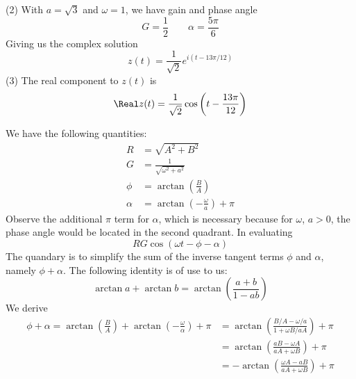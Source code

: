 \documentclass[a4paper]{article}
\begin{document}
(2) With \(a = \sqrt{3}\) and \(\omega = 1\), we have gain and phase angle
\[
	G = \frac{1}{2} \qquad \alpha = \frac{5 \pi }{6}
\]
Giving us the complex solution
\[
	z \!\left( t \right) = \frac{1}{\sqrt{2}}e^{i \!\left( t - 13 \pi /12 \right) }
\]
(3) The real component to \(z \!\left( t \right) \) is
\[
	\Real z \!\left( t \right) = \frac{1}{\sqrt{2}} \cos\left( t - \frac{13 \pi }{12} \right)
\]


We have the following quantities:
\begin{align*}
	R & = \sqrt{A^{2} + B^{2}} \\
	G & = \frac{1}{\sqrt{\omega^{2} + a^{2}}} \\ 
	\phi & = \arctan \!\left( \frac{B}{A} \right) \\
	\alpha & = \arctan \!\left( -\frac{\omega }{a} \right) + \pi 
\end{align*}
Observe the additional \(\pi \) term for \(\alpha \), which is necessary because for \(\omega\), \(a > 0\), the phase angle would be located in the second quadrant. In evaluating
\[
	RG \cos\left( \omega t - \phi - \alpha  \right)
\]
The quandary is to simplify the sum of the inverse tangent terms \(\phi \) and \(\alpha \), namely \(\phi + \alpha \). The following identity is of use to us:
\[
	\arctan a + \arctan b = \arctan \!\left( \frac{a + b}{1 - ab} \right) 
\]
We derive
\begin{align*}
	\phi + \alpha = \arctan \!\left( \frac{B}{A} \right) + \arctan \!\left( -\frac{\omega}{\alpha } \right) + \pi  & = \arctan \!\left( \frac{B/A - \omega / a}{1 + \omega B / aA} \right) + \pi  \\
	 & = \arctan \!\left( \frac{aB - \omega A}{aA + \omega B} \right) + \pi  \\ 
	 & = - \arctan \!\left( \frac{\omega A - aB}{aA + \omega B} \right) + \pi 
\end{align*}
\end{document}
